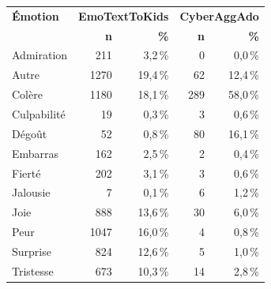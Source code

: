 \begin{tabular}{lrrrr}
\toprule
\textbf{Émotion} & \multicolumn{2}{c}{\textbf{EmoTextToKids}} & \multicolumn{2}{c}{\textbf{CyberAggAdo}} \\
 & \textbf{n} & \textbf{\%} & \textbf{n} & \textbf{\%} \\
\midrule
Admiration & 211 & 3,2\,\% & 0 & 0,0\,\% \\
Autre & 1270 & 19,4\,\% & 62 & 12,4\,\% \\
Colère & 1180 & 18,1\,\% & 289 & 58,0\,\% \\
Culpabilité & 19 & 0,3\,\% & 3 & 0,6\,\% \\
Dégoût & 52 & 0,8\,\% & 80 & 16,1\,\% \\
Embarras & 162 & 2,5\,\% & 2 & 0,4\,\% \\
Fierté & 202 & 3,1\,\% & 3 & 0,6\,\% \\
Jalousie & 7 & 0,1\,\% & 6 & 1,2\,\% \\
Joie & 888 & 13,6\,\% & 30 & 6,0\,\% \\
Peur & 1047 & 16,0\,\% & 4 & 0,8\,\% \\
Surprise & 824 & 12,6\,\% & 5 & 1,0\,\% \\
Tristesse & 673 & 10,3\,\% & 14 & 2,8\,\% \\
\bottomrule
\end{tabular}
